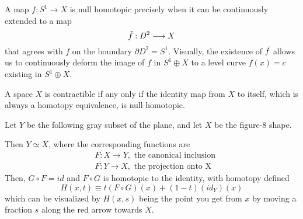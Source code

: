   \begin{example}
  A map $f: S^1 \longrightarrow X$ is null homotopic precisely when it can be continuously extended to a map 
  \[\Tilde{f}: D^2 \longrightarrow X\]
  that agrees with $f$ on the boundary $\partial D^2 = S^1$. Visually, the existence of $\Tilde{f}$ allows us to continuously deform the image of $f$ in $S^1 \oplus X$ to a level curve $f(x) = c$ existing in $S^1 \oplus X$. 
  \end{example}

  \begin{proposition}
  A space $X$ is contractible if any only if the identity map from $X$ to itself, which is always a homotopy equivalence, is null homotopic. 
  \end{proposition}

  \begin{example}
    Let $Y$ be the following gray subset of the plane, and let $X$ be the figure-8 shape. 
    \begin{center}
  \end{center}
  Then $Y \simeq X$, where the corresponding functions are
  \begin{align*}
      & F: X \longrightarrow Y, \text{ the canonical inclusion} \\
      & F: Y \longrightarrow X, \text{ the projection onto X}
  \end{align*}
  Then, $G \circ F = id$ and $F \circ G$ is homotopic to the identity, with homotopy defined
  \[H(x, t) \equiv t (F \circ G) (x) + (1-t) (id_Y) (x)\]
  which can be visualized by $H(x, s)$ being the point you get from $x$ by moving a fraction $s$ along the red arrow towards $X$. 
  \end{example}

